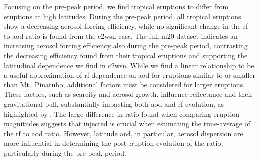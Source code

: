 \documentclass{ametsocV6.1}
\newcommand{\iso}[1][i]{{#1}njected \ce{SO2}}
\begin{document}
Focusing on the pre-peak period, we find tropical eruptions to differ from eruptions at
high latitudes. During the pre-peak period, all tropical eruptions show a decreasing
aerosol forcing efficiency, while no significant change in the \gls{rf} to \gls{aod}
ratio is found from the \gls{c2wsn} case. The full \gls{m20} dataset indicates an
increasing aerosol forcing efficiency also during the pre-peak period, contrasting the
decreasing efficiency found from their tropical eruptions and supporting the latitudinal
dependence we find in \gls{c2wsn}. While we find a linear relationship to be a useful
approximation of \gls{rf} dependence on \gls{aod} for eruptions similar to or smaller
than Mt.\ Pinatubo, additional factors must be considered for larger eruptions.
These factors, such as  scarcity and aerosol growth, influence reflectance and
their gravitational pull, substantially impacting both \gls{aod} and \gls{rf} evolution,
as highlighted by \citet{timmreck2010}. The large difference in ratio found when
comparing eruption magnitudes suggests that \iso{} is crucial when estimating the
time-average of the \gls{rf} to \gls{aod} ratio. However, latitude and, in particular,
aerosol dispersion are more influential in determining the post-eruption evolution of
the ratio, particularly during the pre-peak period.
\end{document}
